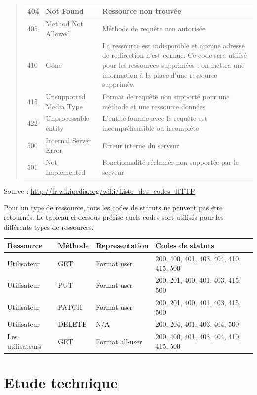 \documentclass{report}
\begin{document}
\begin{quotation}
\begin{tabular}{|p{1cm}|p{4cm}|p{9cm}|}
\hline 404 & Not Found & Ressource non trouvée \\
\hline 405 & Method Not Allowed & Méthode de requête non autorisée \\
\hline 410 & Gone & La ressource est indisponible et aucune adresse de redirection n’est connue. Ce code sera utilisé 
pour les ressources supprimées ; on mettra une information à la place d’une ressource supprimée. \\
\hline 415 & Unsupported Media Type & Format de requête non supporté pour une méthode et une ressource données \\
\hline 422 & Unprocessable entity & L’entité fournie avec la requête est incompréhensible ou incomplète \\
\hline 500 & Internal Server Error & Erreur interne du serveur \\
\hline 501 & Not Implemented & Fonctionnalité réclamée non supportée par le serveur \\
\hline
\end{tabular}
\end{quotation}
\hfill{Source : \url{http://fr.wikipedia.org/wiki/Liste_des_codes_HTTP}}

\medskip

Pour un type de ressource, tous les codes de statuts ne peuvent pas être
retournés. Le tableau ci-dessous précise quels codes sont utilisés pour les
différents types de ressources.

\begin{tabular}{|p{3cm}|p{2cm}|p{3cm}|p{6cm}|}
\hline \bf Ressource & \bf Méthode & \bf Representation & \bf Codes de statuts \\
\hline Utilisateur & GET & Format user & 200, 400, 401, 403, 404, 410, 415, 500 \\
\hline Utilisateur & PUT & Format user & 200, 201, 400, 401, 403, 415, 500 \\
\hline Utilisateur & PATCH & Format user & 200, 201, 400, 401, 403, 415, 500 \\
\hline Utilisateur & DELETE & N/A & 200, 204, 401, 403, 404, 500 \\
\hline Les utilisateurs & GET & Format all-user & 200, 400, 401, 403, 404, 410, 415, 500 \\
\hline
\end{tabular}




\section{Etude technique}
\end{document}
